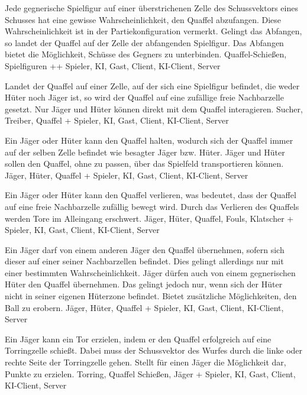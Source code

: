         {Jede gegnerische Spielfigur auf einer überstrichenen Zelle des Schussvektors eines Schusses hat eine gewisse Wahrscheinlichkeit, den Quaffel abzufangen. Diese Wahrscheinlichkeit ist in der Partiekonfiguration vermerkt. Gelingt das Abfangen, so landet der Quaffel auf der Zelle der abfangenden Spielfigur.}
        {Das Abfangen bietet die Möglichkeit, Schüsse des Gegners zu unterbinden.}
        {Quaffel-Schießen, Spielfiguren }
        {++}
        {Spieler, KI, Gast, Client, KI-Client, Server}
        
        {Landet der Quaffel auf einer Zelle, auf der sich eine Spielfigur befindet, die weder Hüter noch Jäger ist, so wird der Quaffel auf eine zufällige freie Nachbarzelle gesetzt.}
        {Nur Jäger und Hüter können direkt mit dem Quaffel interagieren.}
        {Sucher, Treiber, Quaffel}
        {+}
        {Spieler, KI, Gast, Client, KI-Client, Server}		
        
        {Ein Jäger oder Hüter kann den Quaffel halten, wodurch sich der Quaffel immer auf der selben Zelle befindet wie besagter Jäger bzw. Hüter.}
        {Jäger und Hüter sollen den Quaffel, ohne zu passen, über das Spielfeld transportieren können.}
        {Jäger, Hüter, Quaffel}
        {+}
        {Spieler, KI, Gast, Client, KI-Client, Server}	
        
        {Ein Jäger oder Hüter kann den Quaffel verlieren, was bedeutet, dass der Quaffel auf eine freie Nachbarzelle zufällig bewegt wird.}
        {Durch das Verlieren des Quaffels werden Tore im Alleingang erschwert.}
        {Jäger, Hüter, Quaffel, Fouls, Klatscher}
        {+}
        {Spieler, KI, Gast, Client, KI-Client, Server}
    
        {Ein Jäger darf von einem anderen Jäger den Quaffel übernehmen, sofern sich dieser auf einer seiner Nachbarzellen befindet. Dies gelingt allerdings nur mit einer bestimmten Wahrscheinlichkeit. Jäger dürfen auch von einem gegnerischen Hüter den Quaffel übernehmen. Das gelingt jedoch nur, wenn sich der Hüter nicht in seiner eigenen Hüterzone befindet.}
        {Bietet zusätzliche Möglichkeiten, den Ball zu erobern.}
        {Jäger, Hüter, Quaffel}
        {+}
        {Spieler, KI, Gast, Client, KI-Client, Server}

        {Ein Jäger kann ein Tor erzielen, indem er den Quaffel erfolgreich auf eine Torringzelle schießt. Dabei muss der Schussvektor des Wurfes durch die linke oder rechte Seite der Torringzelle gehen.}
        {Stellt für einen Jäger die Möglichkeit dar, Punkte zu erzielen.}
        {Torring, Quaffel Schießen, Jäger}
        {+}
        {Spieler, KI, Gast, Client, KI-Client, Server}
        
